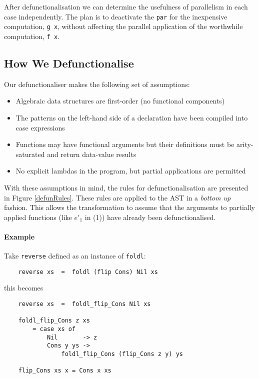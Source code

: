After defunctionalisation we can determine the usefulness of parallelism
in each case independently. The plan is to deactivate the \verb-par- for the
inexpensive computation, \verb-g x-, without affecting the parallel application
of the worthwhile computation, \verb-f x-.

\subsection{How We Defunctionalise}

Our defunctionaliser makes the following set of assumptions:

\begin{itemize}
  \item Algebraic data structures are first-order (no functional components)
  \item The patterns on the left-hand side of a declaration have been compiled
        into case expressions
  \item Functions may have functional arguments but their definitions must be
        arity-saturated and return data-value results
  \item No explicit lambdas in the program, but partial applications are permitted
\end{itemize}

With these assumptions in mind, the rules for defunctionalisation are presented
in Figure \ref{defunRules}. These rules are applied to the AST in a
\emph{bottom up} fashion. This allows the transformation to assume that the
arguments to partially applied functions (like $e'_{1}$ in (1)) have already
been defunctionalised.

\paragraph{Example}

Take \verb-reverse- defined as an instance of \verb-foldl-:

\begin{verbatim}
    reverse xs  =  foldl (flip Cons) Nil xs
\end{verbatim}

this becomes

\begin{verbatim}
    reverse xs  =  foldl_flip_Cons Nil xs

    foldl_flip_Cons z xs 
        = case xs of
            Nil       -> z
            Cons y ys ->
                foldl_flip_Cons (flip_Cons z y) ys

    flip_Cons xs x = Cons x xs
\end{verbatim}

